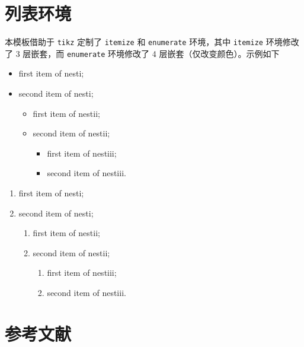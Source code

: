 \documentclass[lang=cn,newtx,10pt,scheme=chinese,pad,twocol]{zznote}
\begin{document}
\section{列表环境}
本模板借助于 \lstinline{tikz} 定制了 \lstinline{itemize} 和 \lstinline{enumerate} 环境，其中 \lstinline{itemize} 环境修改了 3 层嵌套，而 \lstinline{enumerate} 环境修改了 4 层嵌套（仅改变颜色）。示例如下\\[2ex]
\begin{minipage}[b]{0.49\textwidth}
	\begin{itemize}
		\item first item of nesti;
		\item second item of nesti;
		      \begin{itemize}
			      \item first item of nestii;
			      \item second item of nestii;
			            \begin{itemize}
				            \item first item of nestiii;
				            \item second item of nestiii.
			            \end{itemize}
		      \end{itemize}
	\end{itemize}
\end{minipage}
\begin{minipage}[b]{0.49\textwidth}
	\begin{enumerate}
		\item first item of nesti;
		\item second item of nesti;
		      \begin{enumerate}
			      \item first item of nestii;
			      \item second item of nestii;
			            \begin{enumerate}
				            \item first item of nestiii;
				            \item second item of nestiii.
			            \end{enumerate}
		      \end{enumerate}
	\end{enumerate}
\end{minipage}

\section{参考文献}
\end{document}
